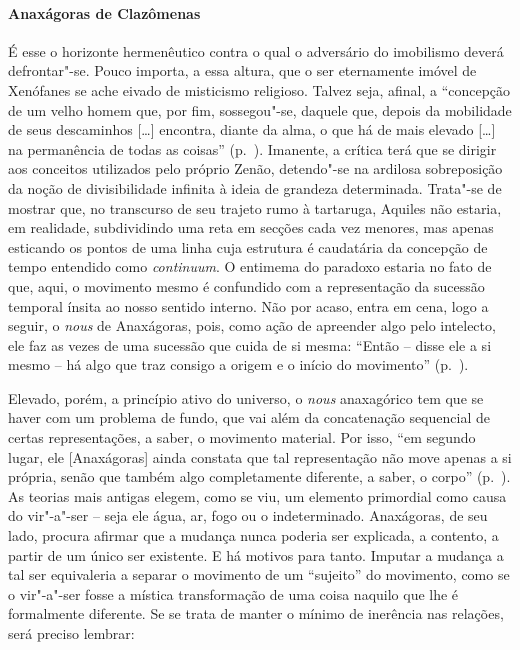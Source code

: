 \paragraph{Anaxágoras de Clazômenas} É esse o horizonte hermenêutico contra o
 qual o adversário do imobilismo deverá defrontar"-se. Pouco importa, a essa
 altura, que o ser eternamente imóvel de Xenófanes se ache eivado de
 misticismo religioso. Talvez seja, afinal, a ``concepção de um velho homem
 que, por fim, sossegou"-se, daquele que, depois da mobilidade de seus
 descaminhos [\ldots] encontra, diante da alma, o que há de mais elevado
 [\ldots] na permanência de todas as coisas'' (p.~\pageref{velhohomem}). 
 Imanente, a crítica terá que se dirigir aos conceitos
 utilizados pelo próprio Zenão, detendo"-se na ardilosa sobreposição da noção
 de divisibilidade infinita à ideia de grandeza determinada. Trata"-se de
 mostrar que, no transcurso de seu trajeto rumo à tartaruga, Aquiles não
 estaria, em realidade, subdividindo uma reta em secções cada vez menores,
 mas apenas esticando os pontos de uma linha cuja estrutura é caudatária da
 concepção de tempo entendido como
\textit{continuum}. O entimema do paradoxo estaria no fato de que, aqui, o
 movimento mesmo é confundido com a representação da sucessão temporal ínsita
 ao nosso sentido interno. Não por acaso, entra em cena, logo a seguir,
 o \textit{nous} de Anaxágoras, pois, como ação de apreender algo pelo
 intelecto, ele faz as vezes de uma sucessão que cuida de si mesma:
 ``Então -- disse ele a si mesmo -- há algo que traz consigo a origem e o
 início do movimento'' (p.~\pageref{aorigemeoinicio}).

Elevado, porém, a princípio ativo do universo, o \textit{nous} anaxagórico tem
que se haver com um problema de fundo, que vai além da concatenação
sequencial de certas representações, a saber, o movimento material. Por isso,
``em segundo lugar, ele [Anaxágoras] ainda constata que tal representação não
move apenas a si própria, senão que também algo completamente diferente, a
saber, o corpo'' (p.~\pageref{asipropria}). As teorias mais antigas elegem,
como se viu, um elemento primordial como causa do vir"-a"-ser -- seja ele
água, ar, fogo ou o indeterminado. Anaxágoras, de seu lado, procura afirmar
que a mudança nunca poderia ser explicada, a contento, a partir de um único
ser existente. E há motivos para tanto. Imputar a mudança a tal ser
equivaleria a separar o movimento de um ``sujeito'' do movimento, como se o
vir"-a"-ser fosse a mística transformação de uma coisa naquilo que lhe é
formalmente diferente. Se se trata de manter o mínimo de inerência nas
relações, será preciso lembrar: 

